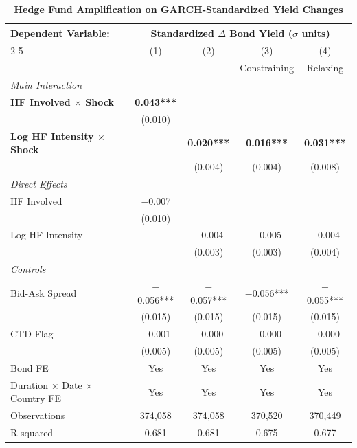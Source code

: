 \documentclass[english, 11pt, oneside]{article}
\begin{document}
\begin{table}[t]
\centering
\caption{\textbf{Hedge Fund Amplification on GARCH-Standardized Yield Changes}}
\footnotesize
\setlength{\tabcolsep}{9pt}
\renewcommand{\arraystretch}{1.1}
\begin{tabular}{l c c c c}
\toprule
\textbf{Dependent Variable:} & \multicolumn{4}{c}{\textbf{Standardized $\Delta$ Bond Yield ($\sigma$ units)}} \\
\cmidrule(lr){2-5}
 & (1) & (2) & (3) & (4) \\
 & & & Constraining & Relaxing \\
\midrule
\textit{Main Interaction} & & & & \\
\textbf{HF Involved $\times$ Shock} & \textbf{0.043***} & & & \\
 & (0.010) & & & \\
\textbf{Log HF Intensity $\times$ Shock} & & \textbf{0.020***} & \textbf{0.016***} & \textbf{0.031***} \\
 & & (0.004) & (0.004) & (0.008) \\
\addlinespace
\textit{Direct Effects} & & & & \\
HF Involved & $-$0.007 & & & \\
 & (0.010) & & & \\
Log HF Intensity & & $-$0.004 & $-$0.005 & $-$0.004 \\
 & & (0.003) & (0.003) & (0.004) \\
\addlinespace
\textit{Controls} & & & & \\
Bid-Ask Spread & $-$0.056*** & $-$0.057*** & $-$0.056*** & $-$0.055*** \\
 & (0.015) & (0.015) & (0.015) & (0.015) \\
CTD Flag & $-$0.001 & $-$0.000 & $-$0.000 & $-$0.000 \\
 & (0.005) & (0.005) & (0.005) & (0.005) \\
\midrule
Bond FE & Yes & Yes & Yes & Yes \\
Duration $\times$ Date $\times$ Country FE & Yes & Yes & Yes & Yes \\
\midrule
Observations & 374,058 & 374,058 & 370,520 & 370,449 \\
R-squared & 0.681 & 0.681 & 0.675 & 0.677 \\
\bottomrule
\end{tabular}
\label{tab:garch_robustness}


\end{table}
\end{document}
